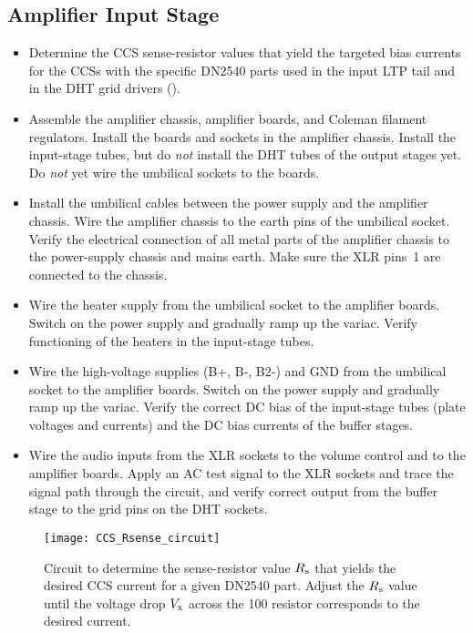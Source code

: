 \subsection{Amplifier Input Stage}
\begin{itemize}
\item Determine the CCS sense-resistor values that yield the targeted bias currents for the CCSs with the specific DN2540 parts used in the input LTP tail and in the DHT grid drivers ().
\item Assemble the amplifier chassis, amplifier boards, and Coleman filament regulators. Install the boards and sockets in the amplifier chassis. Install the input-stage tubes, but do \emph{not} install the DHT tubes of the output stages yet. Do \emph{not} yet wire the umbilical sockets to the boards.
\item Install the umbilical cables between the power supply and the amplifier chassis. Wire the amplifier chassis to the earth pins of the umbilical socket. Verify the electrical connection of all metal parts of the amplifier chassis to the power-supply chassis and mains earth. Make sure the XLR pins~1 are connected to the chassis.
\item Wire the heater supply from the umbilical socket to the amplifier boards. Switch on the power supply and gradually ramp up the variac. Verify functioning of the heaters in the input-stage tubes.
\item Wire the high-voltage supplies (B+, B-, B2-) and GND from the umbilical socket to the amplifier boards. Switch on the power supply and gradually ramp up the variac. Verify the correct DC bias of the input-stage tubes (plate voltages and currents) and the DC bias currents of the buffer stages.
\item Wire the audio inputs from the XLR sockets to the volume control and to the amplifier boards. Apply an AC test signal to the XLR sockets and trace the signal path through the circuit, and verify correct output from the buffer stage to the grid pins on the DHT sockets.
\end{itemize}

\begin{figure}
\begin{center}
\texttt{[image: CCS\_Rsense\_circuit]}
\caption{Circuit to determine the sense-resistor value $R_{\rm s}$ that yields the desired CCS current for a given DN2540 part. Adjust the $R_{\rm s}$ value until the voltage drop $V_{\rm x}$ across the \SI{100}{\Ohm} resistor corresponds to the desired current.}
\end{center}
\end{figure}



